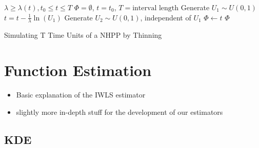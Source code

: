 \documentclass[a4paper,11pt]{article}
\begin{document}
\begin{algorithm}[H]
\begin{algorithmic}[1]
\REQUIRE $\lambda\geq \lambda(t), t_0 \leq t \leq T$
\STATE $\Phi=\emptyset$, $t=t_0$, $T=\text{interval length}$
\STATE Generate $U_1\sim U(0,1)$
\STATE $t=t-\frac{1}{\lambda}\ln(U_1)$
\STATE Generate $U_2\sim U(0,1)$, independent of $U_1$
\STATE $\Phi \leftarrow t$
\ENDIF
\ENDWHILE
\RETURN $\Phi$
\end{algorithmic}
\caption{Simulating T Time Units of a NHPP by Thinning}
\label{alg:seq}
\end{algorithm}
\section{Function Estimation}
\label{sec-4}

\begin{itemize}
\item Basic explanation of the IWLS estimator
\item slightly more in-depth stuff for the development of our estimators
\end{itemize}
\subsection{KDE}
\label{sec-4-1}
\end{document}
